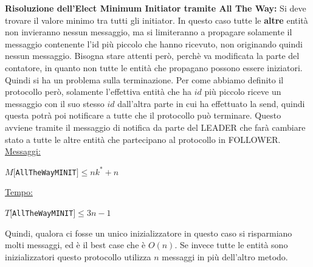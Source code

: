 \textbf{Risoluzione dell'Elect Minimum Initiator tramite All The Way:} Si deve trovare il valore minimo tra tutti gli initiator. In questo caso tutte le \textbf{altre} entità non invieranno nessun messaggio, ma si limiteranno a propagare solamente il messaggio contenente l'id più piccolo che hanno ricevuto, non originando quindi nessun messaggio. Bisogna stare attenti però, perchè va modificata la parte del contatore, in quanto non tutte le entità che propagano possono essere iniziatori. Quindi si ha un problema sulla terminazione. Per come abbiamo definito il protocollo però, solamente l'effettiva entità che ha $id$ più piccolo riceve un messaggio con il suo stesso $id$ dall'altra parte in cui ha effettuato la send, quindi questa potrà poi notificare a tutte che il protocollo può terminare. Questo avviene tramite il messaggio di notifica da parte del LEADER che farà cambiare stato a tutte le altre entità che partecipano al protocollo in FOLLOWER.\\
\underline{Messaggi:}
\begin{center}
  $M[$\texttt{AllTheWayMINIT}$] \leq nk^* + n $
\end{center}
\underline{Tempo:}
\begin{center}
  $T[$\texttt{AllTheWayMINIT}$] \leq 3n - 1$
\end{center}
Quindi, qualora ci fosse un unico inizializzatore in questo caso si risparmiano molti messaggi, ed è il best case che è $O(n)$. Se invece tutte le entità sono inizializzatori questo protocollo utilizza $n$ messaggi in più dell'altro metodo.

